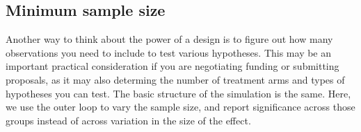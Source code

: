 {
}

\subsection{Minimum sample size}

Another way to think about the power of a design
is to figure out how many observations you need to include
to test various hypotheses.
This may be an important practical consideration
if you are negotiating funding or submitting proposals,
as it may also determing the number of treatment arms
and types of hypotheses you can test.
The basic structure of the simulation is the same.
Here, we use the outer loop to vary the sample size,
and report significance across those groups
instead of across variation in the size of the effect.

{
}

